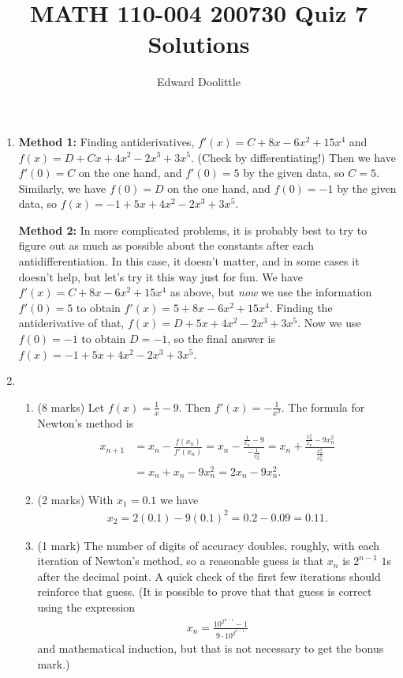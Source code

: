 \documentclass[12pt]{article}
\title{MATH 110-004 200730 Quiz 7 Solutions}
\author{Edward Doolittle}
\newcommand{\ds}{\displaystyle}
\begin{document}
\maketitle

\begin{enumerate}
\item 
  \textbf{Method 1:}  Finding antiderivatives,
  $f'(x)=C+8x-6x^2+15x^4$ and $f(x)=D+Cx+4x^2-2x^3+3x^5$.  (Check
  by differentiating!)  Then we have $f'(0)=C$ on the one hand,
  and $f'(0)=5$ by the given data, so $C=5$.  Similarly, we have
  $f(0)=D$ on the one hand, and $f(0)=-1$ by the given data, so
  $f(x)=-1+5x+4x^2-2x^3+3x^5$.
  
  \textbf{Method 2:}  In more complicated problems, it is probably
  best to try to figure out as much as possible about the constants
  after each antidifferentiation.  In this case, it doesn't matter,
  and in some cases it doesn't help, but let's try it this way just
  for fun.  We have $f'(x)=C+8x-6x^2+15x^4$ as above, but \textit{now}
  we use the information $f'(0)=5$ to obtain $f'(x)=5+8x-6x^2+15x^4$.
  Finding the antiderivative of that, $f(x)=D+5x+4x^2-2x^3+3x^5$.
  Now we use $f(0)=-1$ to obtain $D=-1$, so the final answer is
  $f(x)=-1+5x+4x^2-2x^3+3x^5$.
\item 
  \begin{enumerate}
  \item (8 marks) Let $\ds f(x)=\frac{1}{x}-9$.  
    Then $\ds f'(x)=-\frac{1}{x^2}$.
    The formula for Newton's method is
    \begin{align*}
      x_{n+1} &= x_n - \frac{f(x_n)}{f'(x_n)}
      = x_n - \frac{\ds \frac{1}{x_n}-9}{\ds -\frac{1}{x_n^2}}
      = x_n + \frac{\ds \frac{x_n^2}{x_n}-9x_n^2}{\ds \frac{x_n^2}{x_n^2}}
      \\
      &= x_n + x_n - 9x_n^2 = 2x_n-9x_n^2.
    \end{align*}
  \item (2 marks) With $x_1=0.1$ we have
    \begin{align*}
      x_2 = 2(0.1) - 9(0.1)^2 = 0.2-0.09 = 0.11.
    \end{align*}
  \item (1 mark) The number of digits of accuracy doubles, roughly,
    with each iteration of Newton's method, 
    so a reasonable guess is that $x_n$ is
    $2^{n-1}$ $1$s after the decimal point.  A quick check of the first
    few iterations should reinforce that guess.  (It is possible to prove
    that that guess is correct using the expression 
    \begin{align*}
      x_n=\frac{\ds 10^{2^{n-1}}-1}{\ds 9\cdot 10^{2^{n-1}}}
    \end{align*}
    and mathematical induction, but that is not necessary to get the 
    bonus mark.)
  \end{enumerate}
\end{enumerate}
\end{document}
